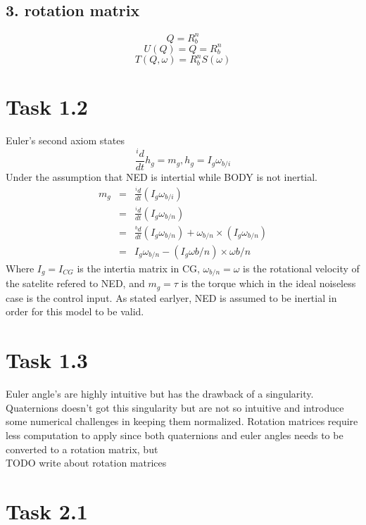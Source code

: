 \documentclass[11pt]{article}
\begin{document}
\subsection*{3. rotation matrix}
\begin{equation}
 Q = R_b^n
\end{equation}
\begin{equation}
 U(Q) = Q = R_b^n
\end{equation}
\begin{equation}
 T(Q,\omega) = R_b^nS(\omega)
\end{equation}

\section*{Task 1.2}
Euler's second axiom states
\[ \frac{^i d}{dt} h_g = m_g, h_g = I_g \omega_{b/i} \]
Under the assumption that NED is intertial while BODY is not inertial.
\begin{eqnarray*}
m_g &=& \frac{^i d}{dt}(I_g \omega_{b/i}) \\
&=& \frac{^i d}{dt}(I_g \omega_{b/n}) \\
&=& \frac{^b d}{dt}(I_g \omega_{b/n}) + \omega_{b/n} \times (I_g \omega_{b/n}) \\
&=& I_g \omega_{b/n} - (I_g \omega{b/n}) \times \omega{b/n}
\end{eqnarray*}
Where $I_g = I_{CG}$ is the intertia matrix in CG, $\omega_{b/n} = \omega$ is the rotational velocity of the satelite refered to NED, and $m_g = \tau$ is the torque which in the ideal noiseless case is the control input. As stated earlyer, NED is assumed to be inertial in order for this model to be valid.

\section{Task 1.3}
Euler angle's are highly intuitive but has the drawback of a singularity. Quaternions doesn't got this singularity but are not so intuitive and introduce some numerical challenges in keeping them normalized. Rotation matrices require less computation to apply since both quaternions and euler angles needs to be converted to a rotation matrix, but 
\\[+1cm] TODO write about rotation matrices

\section{Task 2.1}
\end{document}
